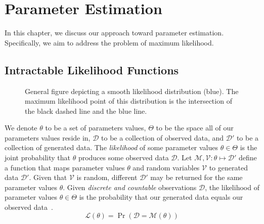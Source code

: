 \chapter{Parameter Estimation}\label{ch:parameterEstimation}
In this chapter, we discuss our approach toward parameter estimation.
Specifically, we aim to address the problem of maximum likelihood.

\section{Intractable Likelihood Functions}\label{sec:intractableLikelihoodFunctions}
\begin{figure}[t]
    \centering{}
    \caption{General figure depicting a smooth likelihood distribution (blue).
    The maximum likelihood point of this distribution is the intersection of the black dashed line and the blue line.
    }\label{fig:likelihoodGeneral}
\end{figure}

We denote $\theta$ to be a set of parameters values, $\Theta$ to be the space all of our parameters values reside in,
$\mathcal{D}$ to be a collection of observed data, and $\mathcal{D}'$ to
be a collection of generated data.
The \emph{likelihood} of some parameter values $\theta \in \Theta$ is the joint probability that $\theta$ produces
some observed data $\mathcal{D}$.
Let $\mathcal{M},\mathcal{V} : \theta \mapsto \mathcal{D}'$ define a function that maps parameter values $\theta$ and random variables
$\mathcal{V}$ to generated data $\mathcal{D}'$.
Given that $\mathcal{V}$ is random, different $\mathcal{D}'$ may be returned for the same parameter values
$\theta$.
Given \emph{discrete and countable} observations $\mathcal{D}$, the likelihood of parameter values $\theta \in \Theta$
is the probability that our generated data equals our observed data~\cite{lintusaariFundamentalsRecentDevelopments2017}.
\begin{equation}\label{eq:likelihood1}
    \mathcal{L}(\theta) = \Pr(\mathcal{D} = \mathcal{M}(\theta))
\end{equation}


